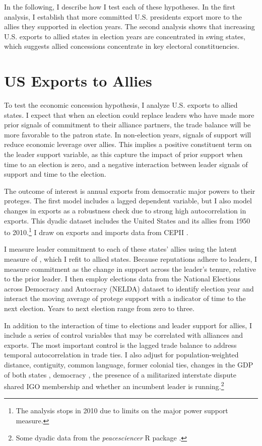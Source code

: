 \documentclass[12pt]{article}
\begin{document}
In the following, I describe how I test each of these hypotheses. 
In the first analysis, I establish that more committed U.S. presidents export more to the allies they supported in election years. 
The second analysis shows that increasing U.S. exports to allied states in election years are concentrated in swing states, which suggests allied concessions concentrate in key electoral constituencies.



\section{US Exports to Allies}

To test the economic concession hypothesis, I analyze U.S. exports to allied states. 
I expect that when an election could replace leaders who have made more prior signals of commitment to their alliance partners, the trade balance will be more favorable to the patron state.
In non-election years, signals of support will reduce economic leverage over allies.
This implies a positive constituent term on the leader support variable, as this capture the impact of prior support when time to an election is zero, and a negative interaction between leader signals of support and time to the election.


The outcome of interest is annual exports from democratic major powers to their proteges. 
The first model includes a lagged dependent variable, but I also model changes in exports as a robustness check due to strong high autocorrelation in exports.
This dyadic dataset includes the United States and its allies from 1950 to 2010.\footnote{The analysis stops in 2010 due to limits on the major power support measure.}
I draw on exports and imports data from CEPII \citep{FouquinHugot2016}.


I measure leader commitment to each of these states' allies using the latent measure of \citet{McManusNieman2019}, which I refit to allied states. 
Because reputations adhere to leaders, I measure commitment as the change in support across the leader's tenure, relative to the prior leader. 
I then employ elections data from the National Elections across Democracy and Autocracy (NELDA) dataset \citep{HydeMarinov2012} to identify election year and interact the moving average of protege support with a indicator of time to the next election.
Years to next election range from zero to three. 


In addition to the interaction of time to elections and leader support for allies, I include a series of control variables that may be correlated with alliances and exports. 
The most important control is the lagged trade balance to address temporal autocorrelation in trade ties.
I also adjust for population-weighted distance, contiguity, common language, former colonial ties, changes in the GDP of both states \citep{FouquinHugot2016}, democracy \citep{Marquez2016}, the presence of a militarized interstate dispute \citep{Gibleretal2016} shared IGO membership \citep{Pevehouseetal2020} and whether an incumbent leader is running.\footnote{Some dyadic data from the \textit{peacesciencer} \textsf{R} package \citep{peacesciencer-package}.}
\end{document}
